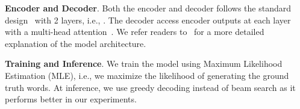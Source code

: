 \documentclass[runningheads]{llncs}
\begin{document}
\kern2mm
\noindent\textbf{Encoder and Decoder}. Both the encoder and decoder follows the standard design~\cite{vaswani2017attention} with 2 layers, i.e., . 
The decoder access encoder outputs at each layer with a multi-head attention~\cite{vaswani2017attention}.  
We refer readers to~\cite{vaswani2017attention} for a more detailed explanation of the model architecture.

\kern2mm
\noindent\textbf{Training and Inference}. 
We train the model using Maximum Likelihood Estimation (MLE), i.e., we maximize the likelihood of generating the ground truth words.
At inference, we use greedy decoding instead of beam search as it performs better in our experiments.



\begin{table}[!t]
\setlength{\tabcolsep}{0.3em}
\small
\centering
\small
\caption{Model comparison on TVC \textit{test-public} set, with different input context}
\label{tab:tvc_res}
\end{table}

\begin{table}[!t]
\setlength{\tabcolsep}{0.3em}
\centering
\small
\caption{Feature ablation on TVC \textit{val} set. All the models use both videos and subtitles}
\label{tab:tvc_feature_ablation}
\end{table}
\end{document}
